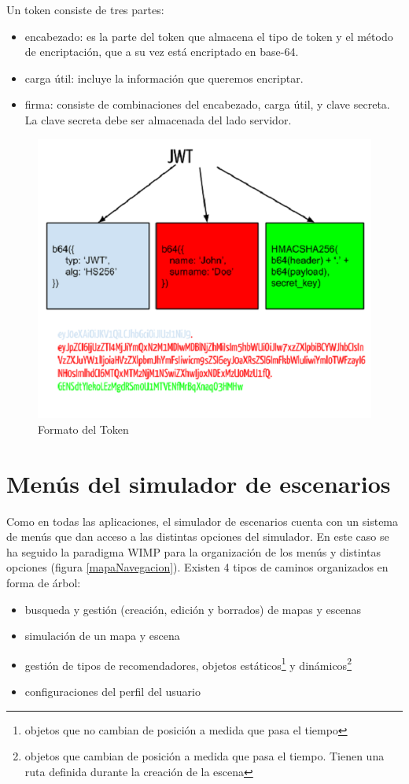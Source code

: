 Un token consiste de tres partes:
\begin{itemize}
	\item encabezado: es la parte del token que almacena el tipo de token y el método de encriptación, que a su vez está encriptado en base-64.
	\item carga útil: incluye la información que queremos encriptar.
	\item firma: consiste de combinaciones del encabezado, carga útil, y clave secreta. La clave secreta debe ser almacenada del lado servidor.
\end{itemize}

\begin{figure}[H]
	\centering\includegraphics[scale=0.5]{imagenes/jwt.png}
	\caption{Formato del Token}
	\label{formatoToken}
\end{figure}

\section{Menús del simulador de escenarios}

Como en todas las aplicaciones, el simulador de escenarios cuenta con un sistema de menús que dan acceso a las distintas opciones del simulador. En este caso se ha seguido la paradigma WIMP para la organización de los menús y distintas opciones (figura \ref{mapaNavegacion}). Existen 4 tipos de caminos organizados en forma de árbol:

\begin{itemize}
	\item busqueda y gestión (creación, edición y borrados) de mapas y escenas
	\item simulación de un mapa y escena
	\item gestión de tipos de recomendadores, objetos estáticos\footnote{objetos que no cambian de posición a medida que pasa el tiempo} y dinámicos\footnote{objetos que cambian de posición a medida que pasa el tiempo. Tienen una ruta definida durante la creación de la escena}
	\item configuraciones del perfil del usuario
\end{itemize} 

